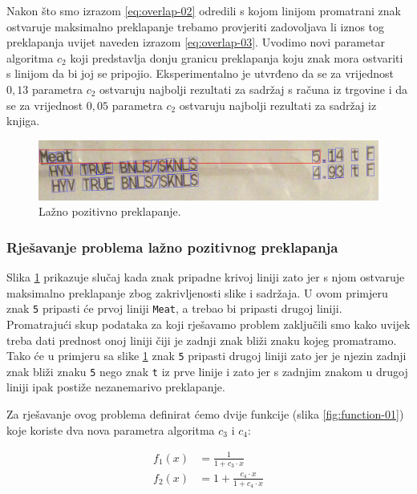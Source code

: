 \documentclass[times, utf8, zavrsni]{fer}
\begin{document}
Nakon što smo izrazom \ref{eq:overlap-02} odredili s kojom linijom promatrani
znak ostvaruje maksimalno preklapanje trebamo provjeriti zadovoljava li iznos
tog preklapanja uvijet naveden izrazom \ref{eq:overlap-03}. Uvodimo novi
parametar algoritma $c_2$ koji predstavlja donju granicu preklapanja koju znak
mora ostvariti s linijom da bi joj se pripojio. Eksperimentalno je utvrđeno da
se za vrijednost $0{,}13$ parametra $c_2$ ostvaruju najbolji rezultati za
sadržaj s računa iz trgovine i da se za vrijednost $0{,}05$ parametra $c_2$
ostvaruju najbolji rezultati za sadržaj iz knjiga.

\begin{figure}[htb]
    \centering
    \captionsetup{justification=centering,margin=2cm}
    \includegraphics[width=\textwidth]{images/overlap-02.png}
    \caption{Lažno pozitivno preklapanje.}
    \label{fig:overlap-02}
\end{figure}


\subsubsection{Rješavanje problema lažno pozitivnog preklapanja}
Slika \ref{fig:overlap-02} prikazuje slučaj kada znak pripadne krivoj liniji
zato jer s njom ostvaruje maksimalno preklapanje zbog zakrivljenosti slike i
sadržaja. U ovom primjeru znak \lstinline{5} pripasti će prvoj liniji
\lstinline{Meat}, a trebao bi pripasti drugoj liniji. Promatrajući skup
podataka za koji rješavamo problem zaključili smo kako uvijek treba dati
prednost onoj liniji čiji je zadnji znak bliži znaku kojeg promatramo. Tako će
u primjeru sa slike \ref{fig:overlap-02} znak \lstinline{5} pripasti drugoj
liniji zato jer je njezin zadnji znak bliži znaku \lstinline{5} nego znak
\lstinline{t} iz prve linije i zato jer s zadnjim znakom u drugoj liniji ipak
postiže nezanemarivo preklapanje.

Za rješavanje ovog problema definirat ćemo dvije funkcije (slika
\ref{fig:function-01})
koje koriste dva nova parametra algoritma $c_3$ i $c_4$:

\begin{align}
f_1(x) &= \frac{1}{1 + c_3 \cdot x} \\[10pt]
f_2(x) &= 1 + \frac{c_4 \cdot x}{1 + c_4 \cdot x}
\end{align}
\end{document}
